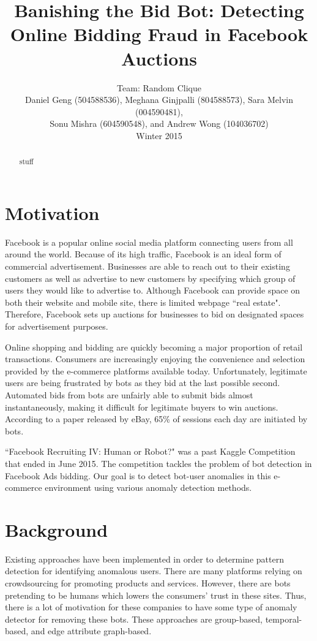 \documentclass{article} %
\title{Banishing the Bid Bot: Detecting Online Bidding Fraud in Facebook Auctions}
\author{
Team: Random Clique \\
Daniel Geng (504588536), Meghana Ginjpalli (804588573), Sara Melvin (004590481), \\
Sonu Mishra (604590548), and Andrew Wong (104036702) \\
Winter 2015
}
\begin{document}
\maketitle

\begin{abstract}

stuff

\end{abstract}

\section{Motivation}

Facebook is a popular online social media platform connecting users from all around the world.
Because of its high traffic, Facebook is an ideal form of commercial advertisement.
Businesses are able to reach out to their existing customers as well as advertise to new customers by specifying which group of users they would like to advertise to.
Although Facebook can provide space on both their website and mobile site, there is limited webpage ``real estate".
Therefore, Facebook sets up auctions for businesses to bid on designated spaces for advertisement purposes.

Online shopping and bidding are quickly becoming a major proportion of retail transactions. \cite{shopping}
Consumers are increasingly enjoying the convenience and selection provided by the e-commerce platforms available today.
Unfortunately, legitimate users are being frustrated by bots as they bid at the last possible second.
Automated bids from bots are unfairly able to submit bids almost instantaneously, making it difficult for legitimate buyers to win auctions.
According to a paper released by eBay, 65\% of sessions each day are initiated by bots. \cite{ebay}

``Facebook Recruiting IV: Human or Robot?" was a past Kaggle Competition that ended in June 2015.
The competition tackles the problem of bot detection in Facebook Ads bidding.
Our goal is to detect bot-user anomalies in this e-commerce environment using various anomaly detection methods.

\section{Background}

Existing approaches have been implemented in order to determine pattern detection for identifying anomalous users.
There are many platforms relying on crowdsourcing for promoting products and services.
However, there are bots pretending to be humans which lowers the consumers' trust in these sites.
Thus, there is a lot of motivation for these companies to have some type of anomaly detector for removing these bots.
These approaches are group-based, temporal-based, and edge attribute graph-based.
\end{document}
